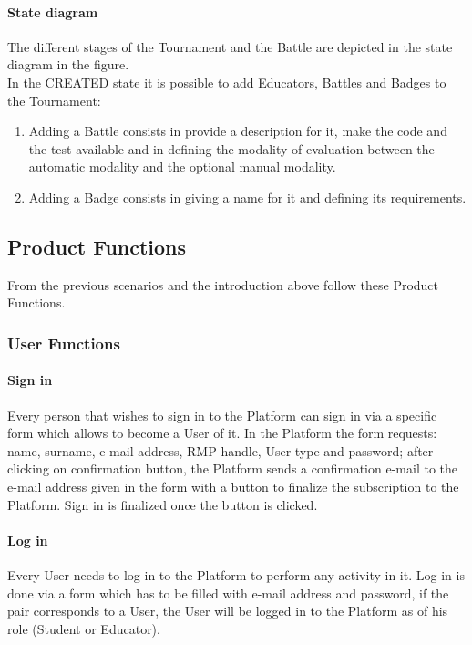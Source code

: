 \paragraph{State diagram}
The different stages of the Tournament and the Battle are depicted in the state diagram in the figure.
\\In the CREATED state it is possible to add Educators, Battles and Badges to the Tournament:
\begin{enumerate}[label=$\bullet$]
    \item Adding a Battle consists in provide a description for it, make the code and the test available and in defining the modality of evaluation between the automatic modality and the optional manual modality.
    \item Adding a Badge consists in giving a name for it and defining its requirements.
\end{enumerate}
\newpage

\subsection{Product Functions}
From the previous scenarios and the introduction above follow these Product Functions.

\subsubsection{User Functions}
\paragraph{Sign in}
Every person that wishes to sign in to the Platform can sign in via a specific form which allows to become a User of it.
In the Platform the form requests: name, surname, e-mail address, RMP handle, User type and password; after clicking on confirmation button, the Platform sends a confirmation e-mail to the e-mail address given in the form with a 
button to finalize the subscription to the Platform. Sign in is finalized once the button is clicked.
\paragraph{Log in}
Every User needs to log in to the Platform to perform any activity in it. Log in is done via a form which has to be filled with e-mail address and password, if the pair corresponds to a User, the User will be logged in to the 
Platform as of his role (Student or Educator).
